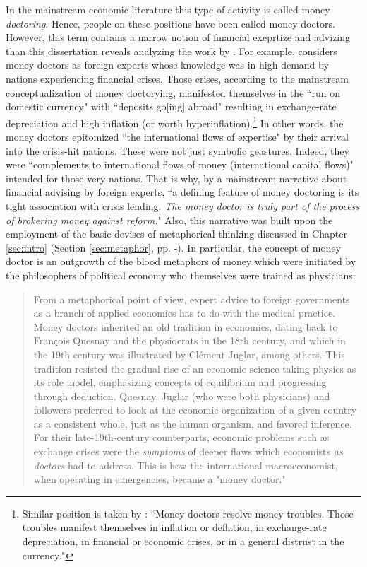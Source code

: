 In the mainstream economic literature this type of activity is called money \textit{doctoring}. Hence, people on these positions have been called money doctors. However, this term contains a narrow notion of financial exeprtize and advizing than this dissertation reveals analyzing the work by \citeauthor{innes1913}. For example, \cite{fland2003} considers money doctors as foreign experts whose knowledge was in high demand by nations experiencing financial crises. Those crises, according to the mainstream conceptualization of money doctorying, manifested themselves in the ``run on domestic currency" with ``deposits go[ing] abroad" resulting in exchange-rate depreciation and high inflation (or worth hyperinflation).\footnote{Similar position is taken by \cite{alvarez2024}: ``Money doctors resolve money troubles. Those troubles manifest themselves in inflation or deflation, in exchange-rate depreciation, in financial or economic crises, or in a general distrust in the currency."}  In other words, the money doctors epitomized ``the international flows of expertise" by their arrival into the crisis-hit nations. These were not just symbolic geastures. Indeed, they were ``complements to international flows of money (international capital flows)" intended for those very nations. That is why, by a mainstream narrative about financial advising by foreign experts, ``a defining feature of money doctoring is its tight association with crisis lending. \textit{The money doctor is truly part of the process of brokering money against reform.}" \citep[p.~3-4, emphasis original]{fland2003} Also, this narrative was built upon the employment of the basic devises of metaphorical thinking discussed in Chapter \ref{sec:intro} (Section \ref{sec:metaphor}, pp. \pageref{sec:metaphor}-\pageref{sec:whats_capital}). In particular, the concept of money doctor is an outgrowth of the blood metaphors of money which were initiated by the philosophers of political economy who themselves were trained as physicians:

\begin{quote}
From a metaphorical point of view, expert advice to foreign governments as a
branch of applied economics has to do with the medical practice. Money
doctors inherited an old tradition in economics, dating back to Fran\c{c}ois Quesnay
and the physiocrats in the 18th century, and which in the 19th century was illustrated by Cl{\'e}ment Juglar, among others. This tradition resisted the gradual rise
of an economic science taking physics as its role model, emphasizing concepts of
equilibrium and progressing through deduction. Quesnay, Juglar (who were both
physicians) and followers preferred to look at the economic organization of a
given country as a consistent whole, just as the human organism, and favored
inference. For their late-19th-century counterparts, economic problems such as
exchange crises were the \textit{symptoms} of deeper flaws which economists \textit{as doctors} had to address. This is how the international macroeconomist, when operating in
emergencies, became a "money doctor." \citep[p.~2, emphasis original]{fland2003}
\end{quote}

